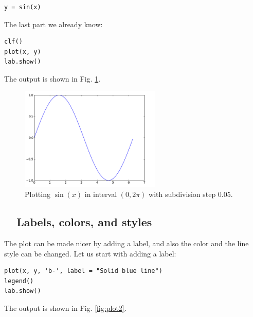 \begin{verbatim}
y = sin(x)
\end{verbatim}
The last part we already know:

\begin{verbatim}
clf()
plot(x, y)
lab.show()
\end{verbatim}
\noindent
The output is shown in Fig. \ref{fig:plot1}.\\[-7mm]

\begin{figure}[!ht]
\begin{center}
\includegraphics[width=0.6\textwidth]{imgp/plot1.png}
\end{center}
\vspace{-6mm}
\caption{Plotting $\sin(x)$ in interval $(0, 2\pi)$ with subdivision step 0.05.}
\label{fig:plot1}
\vspace{-2mm}
\end{figure}
\noindent

\subsection{\ \ Labels, colors, and styles}

The plot can be made nicer by adding a label, and also the color 
and the line style can be changed. Let us start with adding a label:

\begin{verbatim}
plot(x, y, 'b-', label = "Solid blue line")
legend()
lab.show()
\end{verbatim}
The output is shown in Fig. \ref{fig:plot2}.\\[-7mm]


